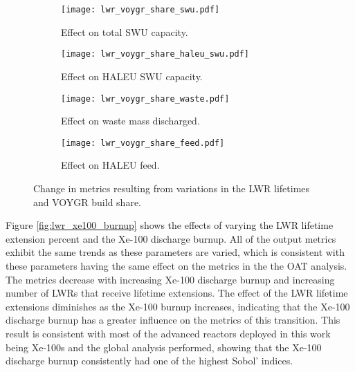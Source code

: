 \begin{figure}   
    \begin{subfigure}[h!]{0.48\textwidth}
        \centering
        \texttt{[image: lwr\_voygr\_share\_swu.pdf]}
        \caption{Effect on total SWU capacity.}
        \label{fig:lwr_voygr_share_swu}
    \end{subfigure}
    \hfill
    \begin{subfigure}[h!]{0.48\textwidth}
        \centering
        \texttt{[image: lwr\_voygr\_share\_haleu\_swu.pdf]}
        \caption{Effect on HALEU SWU capacity.}
        \label{fig:lwr_voygr_share_haleu_swu}
    \end{subfigure}   
    \begin{subfigure}[h!]{0.48\textwidth}
        \centering
        \texttt{[image: lwr\_voygr\_share\_waste.pdf]}
        \caption{Effect on waste mass discharged.}
        \label{fig:lwr_voygr_share_waste}
    \end{subfigure}
    \hfill
    \begin{subfigure}[h!]{0.48\textwidth}
        \centering
        \texttt{[image: lwr\_voygr\_share\_feed.pdf]}
        \caption{Effect on HALEU feed.}
        \label{fig:lwr_voygr_share_feed}
    \end{subfigure}
    \caption{Change in metrics resulting from variations in the 
    LWR lifetimes and VOYGR build share.}
    \label{fig:lwr_voygr_share}
\end{figure}

Figure \ref{fig:lwr_xe100_burnup} shows the effects of varying the 
\gls{LWR} lifetime extension percent and the Xe-100 discharge 
burnup. All of the output metrics exhibit the same trends as these 
parameters are varied, which is consistent with these parameters having 
the same effect on the metrics in the the \gls{OAT} analysis. The metrics 
decrease with increasing 
Xe-100 discharge burnup and increasing number of \glspl{LWR} that 
receive lifetime extensions. The effect of the \gls{LWR} lifetime 
extensions diminishes as the Xe-100 burnup increases, indicating that 
the Xe-100 discharge burnup has a greater influence on the metrics of 
this transition. This result is consistent with most of the advanced 
reactors deployed in this work being Xe-100s and the global analysis 
performed, showing that the Xe-100 discharge burnup consistently had one of 
the highest Sobol' indices. 


